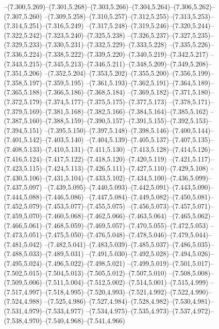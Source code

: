   --(7.300,5.269)--(7.301,5.268)--(7.303,5.266)--(7.304,5.264)--(7.306,5.262)--(7.307,5.260)%
  --(7.309,5.258)--(7.310,5.257)--(7.312,5.255)--(7.313,5.253)--(7.314,5.251)--(7.316,5.249)%
  --(7.317,5.248)--(7.319,5.246)--(7.320,5.244)--(7.322,5.242)--(7.323,5.240)--(7.325,5.238)%
  --(7.326,5.237)--(7.327,5.235)--(7.329,5.233)--(7.330,5.231)--(7.332,5.229)--(7.333,5.228)%
  --(7.335,5.226)--(7.336,5.224)--(7.338,5.222)--(7.339,5.220)--(7.340,5.219)--(7.342,5.217)%
  --(7.343,5.215)--(7.345,5.213)--(7.346,5.211)--(7.348,5.209)--(7.349,5.208)--(7.351,5.206)%
  --(7.352,5.204)--(7.353,5.202)--(7.355,5.200)--(7.356,5.199)--(7.358,5.197)--(7.359,5.195)%
  --(7.361,5.193)--(7.362,5.191)--(7.364,5.189)--(7.365,5.188)--(7.366,5.186)--(7.368,5.184)%
  --(7.369,5.182)--(7.371,5.180)--(7.372,5.179)--(7.374,5.177)--(7.375,5.175)--(7.377,5.173)%
  --(7.378,5.171)--(7.379,5.169)--(7.381,5.168)--(7.382,5.166)--(7.384,5.164)--(7.385,5.162)%
  --(7.387,5.160)--(7.388,5.159)--(7.390,5.157)--(7.391,5.155)--(7.392,5.153)--(7.394,5.151)%
  --(7.395,5.150)--(7.397,5.148)--(7.398,5.146)--(7.400,5.144)--(7.401,5.142)--(7.403,5.140)%
  --(7.404,5.139)--(7.405,5.137)--(7.407,5.135)--(7.408,5.133)--(7.410,5.131)--(7.411,5.130)%
  --(7.413,5.128)--(7.414,5.126)--(7.416,5.124)--(7.417,5.122)--(7.418,5.120)--(7.420,5.119)%
  --(7.421,5.117)--(7.423,5.115)--(7.424,5.113)--(7.426,5.111)--(7.427,5.110)--(7.429,5.108)%
  --(7.430,5.106)--(7.431,5.104)--(7.433,5.102)--(7.434,5.100)--(7.436,5.099)--(7.437,5.097)%
  --(7.439,5.095)--(7.440,5.093)--(7.442,5.091)--(7.443,5.090)--(7.444,5.088)--(7.446,5.086)%
  --(7.447,5.084)--(7.449,5.082)--(7.450,5.081)--(7.452,5.079)--(7.453,5.077)--(7.455,5.075)%
  --(7.456,5.073)--(7.457,5.071)--(7.459,5.070)--(7.460,5.068)--(7.462,5.066)--(7.463,5.064)%
  --(7.465,5.062)--(7.466,5.061)--(7.468,5.059)--(7.469,5.057)--(7.470,5.055)--(7.472,5.053)%
  --(7.473,5.051)--(7.475,5.050)--(7.476,5.048)--(7.478,5.046)--(7.479,5.044)--(7.481,5.042)%
  --(7.482,5.041)--(7.483,5.039)--(7.485,5.037)--(7.486,5.035)--(7.488,5.033)--(7.489,5.031)%
  --(7.491,5.030)--(7.492,5.028)--(7.494,5.026)--(7.495,5.024)--(7.496,5.022)--(7.498,5.021)%
  --(7.499,5.019)--(7.501,5.017)--(7.502,5.015)--(7.504,5.013)--(7.505,5.012)--(7.507,5.010)%
  --(7.508,5.008)--(7.509,5.006)--(7.511,5.004)--(7.512,5.002)--(7.514,5.001)--(7.515,4.999)%
  --(7.517,4.997)--(7.518,4.995)--(7.520,4.993)--(7.521,4.992)--(7.522,4.990)--(7.524,4.988)%
  --(7.525,4.986)--(7.527,4.984)--(7.528,4.982)--(7.530,4.981)--(7.531,4.979)--(7.533,4.977)%
  --(7.534,4.975)--(7.535,4.973)--(7.537,4.972)--(7.538,4.970)--(7.540,4.968)--(7.541,4.966)%
